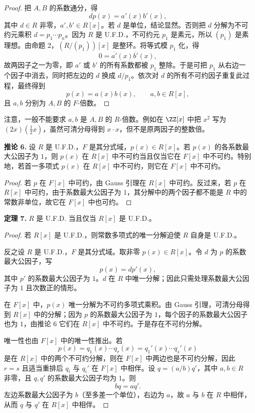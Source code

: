 \begin{proof}
	把 $A,B$ 的系数通分，得
	\[
	d p(x)=a'(x)b'(x),
	\]
	其中 $d\in R$ 非零，$a',b'\in R[x]$。若 $d$ 是单位，结论显然。否则把 $d$ 分解为不可约元乘积 $d=p_1\cdots p_n$。因为 $R$ 是 U.F.D.，不可约元 $p_1$ 是素元，所以 $(p_1)$ 是素理想。由命题 2，$(R/(p_1))[x]$ 是整环。将等式模 $p_1$ 化，得
	\[
	0=\overline{a'}(x)\overline{b'}(x),
	\]
	故两因子之一为零，即 $a'$ 或 $b'$ 的所有系数都被 $p_1$ 整除。于是可把 $p_1$ 从右边一个因子中消去，同时把左边的 $d$ 换成 $d/p_1$。依次对 $d$ 的所有不可约因子重复此过程，最终得到
	\[
	p(x)=a(x)b(x),\qquad a,b\in R[x],
	\]
	且 $a,b$ 分别为 $A,B$ 的 $F$-倍数。
\end{proof}

注意，一般不能要求 $a,b$ 是 $A,B$ 的 $R$-倍数。例如在 $\ZZ[x]$ 中把 $x^2$ 写为 $(2x)(\frac12x)$，虽然可清分母得到 $x\cdot x$，但不是原两因子的整数倍。

\noindent\textbf{推论 6.} 设 $R$ 是 U.F.D.，$F$ 是其分式域，$p(x)\in R[x]$。若 $p(x)$ 的各系数最大公因子为 $1$，则 $p(x)$ 在 $R[x]$ 中不可约当且仅当它在 $F[x]$ 中不可约。特别地，若首一多项式 $p(x)$ 在 $R[x]$ 中不可约，则它在 $F[x]$ 中不可约。

\begin{proof}
	若 $p$ 在 $F[x]$ 中可约，由 Gauss 引理在 $R[x]$ 中可约。反过来，若 $p$ 在 $R[x]$ 中可约，由于系数最大公因子为 $1$，其分解中的两个因子都不能是 $R$ 中的常数非单位，故它在 $F[x]$ 中也可约。
\end{proof}

\noindent\textbf{定理 7.} $R$ 是 U.F.D. 当且仅当 $R[x]$ 是 U.F.D.。

\begin{proof}
	若 $R[x]$ 是 U.F.D.，则常数多项式的唯一分解迫使 $R$ 自身是 U.F.D.。
	
	反之设 $R$ 是 U.F.D.，$F$ 是其分式域。取非零 $p(x)\in R[x]$。令 $d$ 为 $p$ 的系数最大公因子，写
	\[
	p(x)=d p'(x),
	\]
	其中 $p'$ 的系数最大公因子为 $1$。$d$ 在 $R$ 中唯一分解；因此只需处理系数最大公因子为 $1$ 且次数正的情形。
	
	在 $F[x]$ 中，$p(x)$ 唯一分解为不可约多项式乘积。由 Gauss 引理，可清分母得到 $R[x]$ 中的分解；因为 $p$ 的系数最大公因子为 $1$，每个因子的系数最大公因子也为 $1$，由推论 6 它们在 $R[x]$ 中不可约。于是存在不可约分解。
	
	唯一性也由 $F[x]$ 中的唯一性推出。若
	\[
	p(x)=q_1(x)\cdots q_r(x)=q_1'(x)\cdots q_s'(x)
	\]
	是在 $R[x]$ 中的两个不可约分解，则在 $F[x]$ 中两边也是不可约分解，因此 $r=s$ 且适当重排后 $q_i$ 与 $q_i'$ 在 $F[x]$ 中相伴。设 $q=(a/b)q'$，其中 $a,b\in R$ 非零，且 $q,q'$ 的系数最大公因子均为 $1$。则
	\[
	bq=aq'.
	\]
	左边系数最大公因子为 $b$（至多差一个单位），右边为 $a$，故 $a$ 与 $b$ 在 $R$ 中相伴，从而 $q$ 与 $q'$ 在 $R[x]$ 中相伴。
\end{proof}

